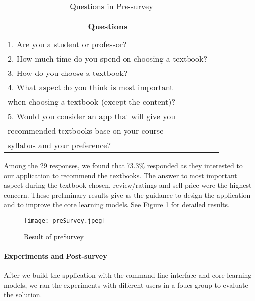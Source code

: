 \begin{table}[ht] 
\caption{Questions in Pre-survey}
\label{Pre-survey}
\begin{center}
\begin{tabular}{ll}
\multicolumn{1}{c}{\bf Questions} 
\\ \hline \\
1. Are you a student or professor?\\
2. How much time do you spend on choosing a textbook?\\
3. How do you choose a textbook?\\
4. What aspect do you think is most important\\
when choosing a textbook (except the content)? \\
5. Would you consider an app that will give you \\
recommended textbooks base on your course \\
syllabus and your preference? \\
\end{tabular}
\end{center}
\end{table}
Among the 29 responses, we found that 73.3\% responded as they interested to our application to recommend the textbooks. The answer to most important aspect during the textbook chosen, review/ratings and sell price were the highest concern. These preliminary results give us the guidance to design the application and to improve the core learning models. See Figure \ref{result_of_presurvey} for detailed results.

\begin{figure}[ht]
\caption{Result of preSurvey}
\label{result_of_presurvey}
\centering
\texttt{[image: preSurvey.jpeg]}
\end{figure}

\paragraph{Experiments and Post-survey}
After we build the application with the command line interface and core learning models, we ran the experiments with different users in a foucs group to evaluate the solution.

